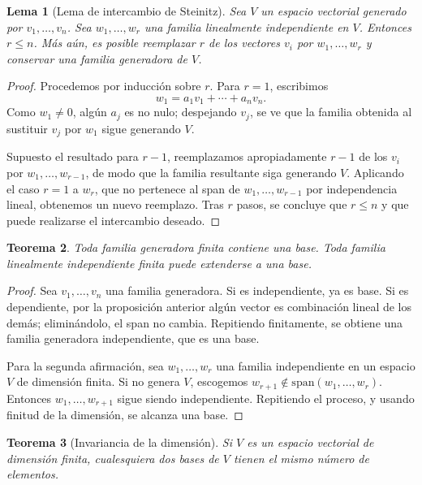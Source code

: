 \documentclass[10pt,a4paper,oneside]{article}
\theoremstyle{plain}
\newtheorem{theorem}{Teorema}[section]
\newtheorem{lemma}[theorem]{Lema}
\theoremstyle{definition}
\theoremstyle{remark}
\newcommand{\Span}{\mathrm{span}}
\begin{document}
\begin{lemma}[Lema de intercambio de Steinitz]
Sea \(V\) un espacio vectorial generado por \(v_1,\dots,v_n\). Sea \(w_1,\dots,w_r\) una familia linealmente independiente en \(V\). Entonces \(r\le n\). Más aún, es posible reemplazar \(r\) de los vectores \(v_i\) por \(w_1,\dots,w_r\) y conservar una familia generadora de \(V\).
\end{lemma}

\begin{proof}
Procedemos por inducción sobre \(r\). Para \(r=1\), escribimos
\[
w_1=a_1v_1+\cdots+a_nv_n.
\]
Como \(w_1\neq 0\), algún \(a_j\) es no nulo; despejando \(v_j\), se ve que la familia obtenida al sustituir \(v_j\) por \(w_1\) sigue generando \(V\).

Supuesto el resultado para \(r-1\), reemplazamos apropiadamente \(r-1\) de los \(v_i\) por \(w_1,\dots,w_{r-1}\), de modo que la familia resultante siga generando \(V\). Aplicando el caso \(r=1\) a \(w_r\), que no pertenece al span de \(w_1,\dots,w_{r-1}\) por independencia lineal, obtenemos un nuevo reemplazo. Tras \(r\) pasos, se concluye que \(r\le n\) y que puede realizarse el intercambio deseado. \end{proof}

\begin{theorem}
Toda familia generadora finita contiene una base. Toda familia linealmente independiente finita puede extenderse a una base.
\end{theorem}

\begin{proof}
Sea \(v_1,\dots,v_n\) una familia generadora. Si es independiente, ya es base. Si es dependiente, por la proposición anterior algún vector es combinación lineal de los demás; eliminándolo, el span no cambia. Repitiendo finitamente, se obtiene una familia generadora independiente, que es una base.

Para la segunda afirmación, sea \(w_1,\dots,w_r\) una familia independiente en un espacio \(V\) de dimensión finita. Si no genera \(V\), escogemos \(w_{r+1}\notin \Span(w_1,\dots,w_r)\). Entonces \(w_1,\dots,w_{r+1}\) sigue siendo independiente. Repitiendo el proceso, y usando finitud de la dimensión, se alcanza una base. \end{proof}

\begin{theorem}[Invariancia de la dimensión]
Si \(V\) es un espacio vectorial de dimensión finita, cualesquiera dos bases de \(V\) tienen el mismo número de elementos.
\end{theorem}
\end{document}
